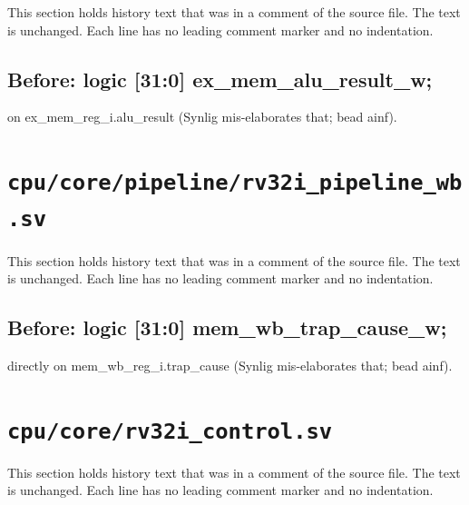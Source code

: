 This section holds history text that was in a comment of the source file. The text is unchanged. Each line has no leading comment marker and no indentation.

\begin{record}

\subsection*{Before: logic [31:0] ex\_mem\_alu\_result\_w;}

\begin{textblock}
on ex_mem_reg_i.alu_result (Synlig mis-elaborates that; bead ainf).
\end{textblock}

\end{record}

\section{\texttt{cpu/core/pipeline/rv32i\_pipeline\_wb.sv}}\label{cr:mod:rv32i-pipeline-wb}

This section holds history text that was in a comment of the source file. The text is unchanged. Each line has no leading comment marker and no indentation.

\begin{record}

\subsection*{Before: logic [31:0] mem\_wb\_trap\_cause\_w;}

\begin{textblock}
directly on mem_wb_reg_i.trap_cause (Synlig mis-elaborates that; bead ainf).
\end{textblock}

\end{record}

\section{\texttt{cpu/core/rv32i\_control.sv}}\label{cr:mod:rv32i-control}

This section holds history text that was in a comment of the source file. The text is unchanged. Each line has no leading comment marker and no indentation.


